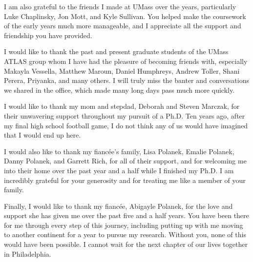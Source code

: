 I am also grateful to the friends I made at UMass over the years, particularly Luke Chaplinsky, Jon Mott, and Kyle Sullivan. You helped make the coursework of the early years much more manageable, and I appreciate all the support and friendship you have provided.

I would like to thank the past and present graduate students of the UMass ATLAS group whom I have had the pleasure of becoming friends with, especially Makayla Vessella, Matthew Maroun, Daniel Humphreys, Andrew Toller, Shani Perera, Priyanka, and many others. I will truly miss the banter and conversations we shared in the office, which made many long days pass much more quickly.

I would like to thank my mom and stepdad, Deborah and Steven Marczak, for their unwavering support throughout my pursuit of a Ph.D. Ten years ago, after my final high school football game, I do not think any of us would have imagined that I would end up here.

I would also like to thank my fiancée's family, Lisa Polanek, Emalie Polanek, Danny Polanek, and Garrett Rich, for all of their support, and for welcoming me into their home over the past year and a half while I finished my Ph.D. I am incredibly grateful for your generosity and for treating me like a member of your family.

Finally, I would like to thank my fiancée, Abigayle Polanek, for the love and support she has given me over the past five and a half years. You have been there for me through every step of this journey, including putting up with me moving to another continent for a year to pursue my research. Without you, none of this would have been possible. I cannot wait for the next chapter of our lives together in Philadelphia.
